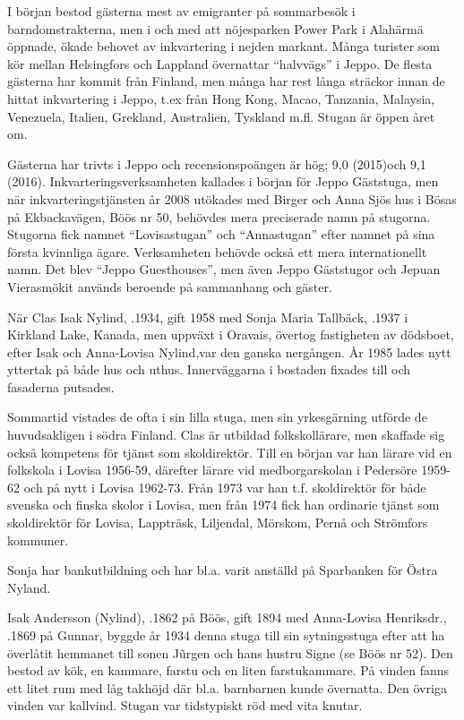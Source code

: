 I början bestod gästerna mest av emigranter på sommarbesök i barndomstrakterna, men i och med att nöjesparken Power Park i Alahärmä öppnade, ökade behovet av inkvartering i nejden markant. Många turister som kör mellan Helsingfors och Lappland övernattar ``halvvägs'' i Jeppo. De flesta gästerna har kommit från Finland, men många har rest långa sträckor innan de hittat inkvartering i Jeppo, t.ex från Hong Kong, Macao, Tanzania, Malaysia, Venezuela, Italien, Grekland, Australien, Tyskland m.fl. Stugan är öppen året om.

Gästerna har trivts i Jeppo och recensionspoängen är hög; 9,0 (2015)och 9,1 (2016). Inkvarteringsverksamheten kallades i början för Jeppo Gäststuga, men när inkvarteringstjänsten år 2008 utökades med Birger och Anna Sjös hus i Bösas på Ekbackavägen, Böös nr 50, behövdes mera preciserade namn på stugorna. Stugorna fick namnet ``Lovisastugan'' och ``Annastugan'' efter namnet på sina första kvinnliga ägare. Verksamheten behövde också ett mera internationellt namn. Det blev ``Jeppo Guesthouses'', men även Jeppo Gäststugor och Jepuan Vierasmökit används beroende på sammanhang och gäster.


%
När Clas Isak Nylind, .1934, gift 1958 med Sonja Maria Tallbäck, .1937 i Kirkland Lake, Kanada, men uppväxt i Oravais, övertog fastigheten av dödsboet, efter Isak och Anna-Lovisa Nylind,var den ganska nergången. År 1985 lades nytt yttertak på både hus och uthus. Innerväggarna i bostaden fixades till och fasaderna putsades.

Sommartid vistades de ofta i sin lilla stuga, men sin yrkesgärning utförde de huvudsakligen i södra Finland. Clas är utbildad folkskollärare, men skaffade sig också kompetens för tjänst som skoldirektör. Till en början var han lärare vid en folkskola i Lovisa 1956-59, därefter lärare vid medborgarskolan i Pedersöre 1959-62 och på nytt i Lovisa 1962-73. Från 1973 var han t.f. skoldirektör för både svenska och finska skolor i Lovisa, men från 1974 fick han ordinarie tjänst som skoldirektör för Lovisa, Lappträsk, Liljendal, Mörskom, Pernå och Strömfors kommuner.

Sonja har bankutbildning och har bl.a. varit anställd på Sparbanken för Östra Nyland.


%
Isak Andersson (Nylind), .1862 på Böös, gift 1894 med Anna-Lovisa Henriksdr., .1869 på Gunnar, byggde år 1934 denna stuga till sin sytningsstuga efter att ha överlåtit hemmanet till sonen Jũrgen och hans hustru Signe (se Böös nr 52). Den bestod av kök, en kammare, farstu och en liten farstukammare. På vinden fanns ett litet rum med låg takhöjd där bl.a. barnbarnen kunde övernatta. Den övriga vinden var kallvind. Stugan var tidstypiskt röd med vita knutar.

